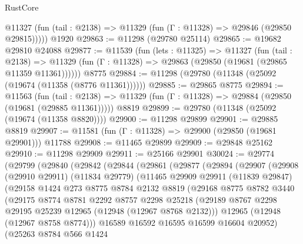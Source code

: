 \begin{lexlean}{RustCore}
\begin{coremodule}
      @11327 (fun (tail : @2138) => @11329 (fun (Γ : @11328) => @29846 (@29850 @29815)))))
    @1920
@29863 := @11298 (@29780 @25114)
@29865 := @19682 @29810 @24088
@29877 := @11539
    (fun (lets : @11325) =>
    @11327
      (fun (tail : @2138) =>
      @11329 (fun (Γ : @11328) => @29863 (@29850 (@19681 (@29865 @11359 @11361))))))
    @8775
@29884 := @11298 (@29780 (@11348 (@25092 (@19674 (@11358 (@8776 @11361))))))
@29885 := @29865 @8775
@29894 := @11563
    (fun (tail : @2138) => @11329 (fun (Γ : @11328) => @29884 (@29850 (@19681 (@29885 @11361)))))
    @8819
@29899 := @29780 (@11348 (@25092 (@19674 (@11358 @8820))))
@29900 := @11298 @29899
@29901 := @29885 @8819
@29907 := @11581 (fun (Γ : @11328) => @29900 (@29850 (@19681 @29901))) @11788
@29908 := @11465 @29899
@29909 := @29848 @25162
@29910 := @11298 @29909
@29911 := @25166 @29901
@30024 := @29774
    (@29799
      (@29840
        (@29842
          (@29844
            (@29861
              (@29877
                (@29894
                  (@29907
                    (@29908
                      (@29910 @29911)
                      (@11834 @29779)
                      (@11465
                        @29909
                        @29911
                        (@11839 @29847)
                        (@29158
                          @1424
                          @273
                          @8775
                          @8784
                          @2132
                          @8819
                          (@29168
                            @8775
                            @8782
                            @3440
                            (@29175
                              @8774
                              @8781
                              @2292
                              @8757
                              @2298
                              @25218
                              (@29189
                                @8767
                                @2298
                                @29195
                                @25239
                                @12965
                                (@12948 (@12967 @8768 @2132)))
                              @12965
                              (@12948 (@12967 @8758 @8774)))
                            @16589
                            @16592
                            @16595
                            @16599
                            @16604
                            @20952)
                          (@25263
                            @8784
                            @566
                            @1424

\end{coremodule}
\end{lexlean}
